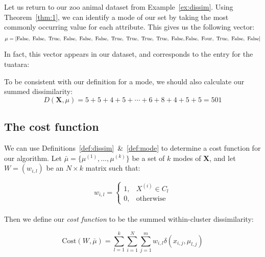 \begin{example}\label{ex:mode}
    Let us return to our zoo animal dataset from Example~\ref{ex:dissim}. Using 
    Theorem~\ref{thm:1}, we can identify a mode of our set by taking the most 
    commonly occurring value for each attribute. This gives us the following 
    vector:
    \[
        \mu = \left[\false, \ \false, \ \true, \ \false, \ \false, \ \false, \
        \true, \ \true, \ \true, \ \true, \ \false, \false, \ \text{Four}, \ 
        \true, \ \false, \ \false\right]
    \]

    In fact, this vector appears in our dataset, and corresponds to the entry 
    for the tuatara:
    
    \begin{table}[h]
        \resizebox{\textwidth}{!}{%
        \centering
        \label{tab:tuatara}
    }
    \end{table}

    To be consistent with our definition for a mode, we should also calculate 
    our summed dissimilarity:
    \[
        D(\textbf{X}, \mu) = 5 + 5 + 4 + 5 + \cdots + 6 + 8 + 4 + 5 + 5 = 501
    \]
\end{example}

\subsection{The cost function}\label{subsec:cost}

We can use Definitions~\ref{def:dissim}~\&~\ref{def:mode} to determine a cost 
function for our algorithm. Let \(\bar{\mu} = \{\mu^{(1)}, \ldots, \mu^{(k)}\}\) 
be a set of \(k\) modes of \textbf{X}, and let \(W = (w_{i,l})\) be an \(N 
\times k\) matrix such that:

\[ 
    w_{i,l} = \begin{cases}
                1, & X^{(i)} \in C_l \\
                0, & \text{otherwise}
              \end{cases}
\]\\

Then we define our \emph{cost function} to be the summed within-cluster 
dissimilarity:

\begin{equation}
    \text{Cost}(W, \bar{\mu}) = \sum_{l=1}^{k} \sum_{i=1}^{N} 
                                \sum_{j=1}^{m} w_{i,l} 
                                \delta(x_{i,j}, \mu_{l,j})
\end{equation}


